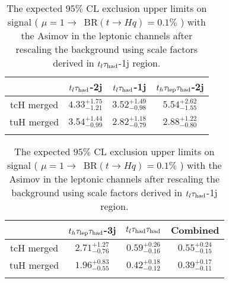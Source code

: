\begin{table}
\centering
\begin{tabular}{cccc} \toprule\toprule
 & $t_l\tau_\text{had}$-2j & $t_l\tau_\text{had}$-1j & $t_h\tau_\text{lep}{}\tau_\text{had}$-2j\\\midrule
tcH merged & $4.33^{+1.75}_{-1.21}$ & $3.52^{+1.49}_{-0.98}$ & $5.54^{+2.62}_{-1.55}$\\
tuH merged & $3.54^{+1.44}_{-0.99}$ & $2.82^{+1.18}_{-0.79}$ & $2.88^{+1.22}_{-0.80}$\\
\bottomrule\bottomrule\\
\end{tabular}
\begin{tabular}{cccc} \toprule\toprule
 & $t_h\tau_\text{lep}{}\tau_\text{had}$-3j & $t_l\tau_\text{had}{}\tau_\text{had}$ & Combined\\\midrule
tcH merged & $2.71^{+1.27}_{-0.76}$ & $0.59^{+0.26}_{-0.16}$ & $0.55^{+0.24}_{-0.15}$\\
tuH merged & $1.96^{+0.83}_{-0.55}$ & $0.42^{+0.18}_{-0.12}$ & $0.39^{+0.17}_{-0.11}$\\
\bottomrule\bottomrule\\
\end{tabular}
\caption{The expected $95\%$ CL exclusion upper limits on signal ( $\mu=1\to$~BR$(t\to Hq)=0.1\%$ ) with the Asimov in the leptonic channels after rescaling the background using scale factors derived in  $t_l\tau_\text{had}$-1j region.} 
\label{tab:tthML_rescaled_limit_1j}
\end{table}

